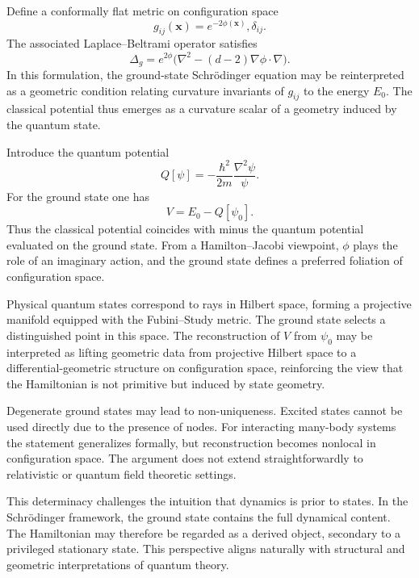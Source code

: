 Define a conformally flat metric on configuration space
\begin{equation}
g_{ij}(\mathbf{x}) = e^{-2\phi(\mathbf{x})},\delta_{ij}.
\end{equation}
The associated Laplace--Beltrami operator satisfies
\begin{equation}
\Delta_g = e^{2\phi}\bigl(\nabla^2 - (d-2)\nabla \phi \cdot \nabla\bigr).
\end{equation}
In this formulation, the ground-state Schr\"odinger equation may be reinterpreted as a geometric condition relating curvature invariants of $g_{ij}$ to the energy $E_0$. The classical potential thus emerges as a curvature scalar of a geometry induced by the quantum state.

Introduce the quantum potential
\begin{equation}
Q[\psi] = -\frac{\hbar^2}{2m}\frac{\nabla^2\psi}{\psi}.
\end{equation}
For the ground state one has
\begin{equation}
V = E_0 - Q[\psi_0].
\end{equation}
Thus the classical potential coincides with minus the quantum potential evaluated on the ground state. From a Hamilton--Jacobi viewpoint, $\phi$ plays the role of an imaginary action, and the ground state defines a preferred foliation of configuration space.

Physical quantum states correspond to rays in Hilbert space, forming a projective manifold equipped with the Fubini--Study metric. The ground state selects a distinguished point in this space. The reconstruction of $V$ from $\psi_0$ may be interpreted as lifting geometric data from projective Hilbert space to a differential-geometric structure on configuration space, reinforcing the view that the Hamiltonian is not primitive but induced by state geometry.

Degenerate ground states may lead to non-uniqueness. Excited states cannot be used directly due to the presence of nodes. For interacting many-body systems the statement generalizes formally, but reconstruction becomes nonlocal in configuration space. The argument does not extend straightforwardly to relativistic or quantum field theoretic settings.

This determinacy challenges the intuition that dynamics is prior to states. In the Schr\"odinger framework, the ground state contains the full dynamical content. The Hamiltonian may therefore be regarded as a derived object, secondary to a privileged stationary state. This perspective aligns naturally with structural and geometric interpretations of quantum theory.


